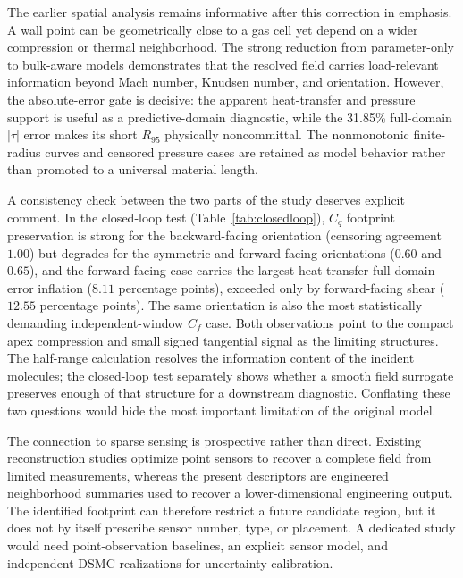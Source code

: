\documentclass[aip,pof,preprint,floatfix,amsmath,amssymb]{revtex4-2}
\begin{document}
The earlier spatial analysis remains informative after this correction in emphasis. A wall point can be geometrically close to a gas cell yet depend on a wider compression or thermal neighborhood. The strong reduction from parameter-only to bulk-aware models demonstrates that the resolved field carries load-relevant information beyond Mach number, Knudsen number, and orientation. However, the absolute-error gate is decisive: the apparent heat-transfer and pressure support is useful as a predictive-domain diagnostic, while the 31.85\% full-domain $|\tau|$ error makes its short $R_{95}$ physically noncommittal. The nonmonotonic finite-radius curves and censored pressure cases are retained as model behavior rather than promoted to a universal material length.

A consistency check between the two parts of the study deserves explicit comment. In the closed-loop test (Table~\ref{tab:closedloop}), $C_q$ footprint preservation is strong for the backward-facing orientation (censoring agreement $1.00$) but degrades for the symmetric and forward-facing orientations ($0.60$ and $0.65$), and the forward-facing case carries the largest heat-transfer full-domain error inflation ($8.11$ percentage points), exceeded only by forward-facing shear ($12.55$ percentage points). The same orientation is also the most statistically demanding independent-window $C_f$ case. Both observations point to the compact apex compression and small signed tangential signal as the limiting structures. The half-range calculation resolves the information content of the incident molecules; the closed-loop test separately shows whether a smooth field surrogate preserves enough of that structure for a downstream diagnostic. Conflating these two questions would hide the most important limitation of the original model.

The connection to sparse sensing is prospective rather than direct. Existing reconstruction studies optimize point sensors to recover a complete field from limited measurements, whereas the present descriptors are engineered neighborhood summaries used to recover a lower-dimensional engineering output.\cite{Manohar2018,Fukami2021Sparse,Santos2023Senseiver,Williams2024SHRED,Kong2025CrossAttention,Wang2025Generative,Zhang2026Sparse,Liang2026Sensor} The identified footprint can therefore restrict a future candidate region, but it does not by itself prescribe sensor number, type, or placement. A dedicated study would need point-observation baselines, an explicit sensor model, and independent DSMC realizations for uncertainty calibration.
\end{document}
